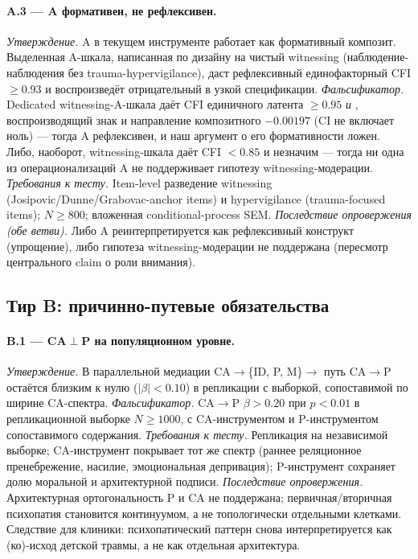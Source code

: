 \paragraph{A.3 --- A формативен, не рефлексивен.}
\emph{Утверждение.} A в текущем инструменте работает как формативный композит. Выделенная A-шкала, написанная по дизайну на чистый witnessing (наблюдение-наблюдения без trauma-hypervigilance), даст рефлексивный единофакторный CFI $\geq 0.93$ и воспроизведёт отрицательный \IMM{} в узкой спецификации.
\emph{Фальсификатор.} Dedicated witnessing-A-шкала даёт CFI единичного латента $\geq 0.95$ \emph{и} \IMM{}, воспроизводящий знак и направление композитного $-0.00197$ (CI не включает ноль) --- тогда A рефлексивен, и наш аргумент о его формативности ложен. Либо, наоборот, witnessing-шкала даёт CFI $< 0.85$ и \IMM{} незначим --- тогда ни одна из операционализаций A не поддерживает гипотезу witnessing-модерации.
\emph{Требования к тесту.} Item-level разведение witnessing (Josipovic/Dunne/Grabovac-anchor items) и hypervigilance (trauma-focused items); $N \geq 800$; вложенная conditional-process SEM.
\emph{Последствие опровержения (обе ветви).} Либо A реинтерпретируется как рефлексивный конструкт (упрощение), либо гипотеза witnessing-модерации не поддержана (пересмотр центрального claim о роли внимания).

\subsection{Тир B: причинно-путевые обязательства}
\label{subsec:falsification_tier_b}

\paragraph{B.1 --- CA$\perp$P на популяционном уровне.}
\emph{Утверждение.} В параллельной медиации CA$\to$\{ID, P, M\}$\to$\EAF{} путь CA$\to$P остаётся близким к нулю ($|\beta| < 0.10$) в репликации с выборкой, сопоставимой по ширине CA-спектра.
\emph{Фальсификатор.} CA$\to$P $\beta > 0.20$ при $p < 0.01$ в репликационной выборке $N \geq 1000$, с CA-инструментом и P-инструментом сопоставимого содержания.
\emph{Требования к тесту.} Репликация на независимой выборке; CA-инструмент покрывает тот же спектр (раннее реляционное пренебрежение, насилие, эмоциональная депривация); P-инструмент сохраняет долю моральной и архитектурной подписи.
\emph{Последствие опровержения.} Архитектурная ортогональность P и CA не поддержана; первичная/вторичная психопатия становится континуумом, а не топологически отдельными клетками. Следствие для клиники: психопатический паттерн снова интерпретируется как (ко)-исход детской травмы, а не как отдельная архитектура.

